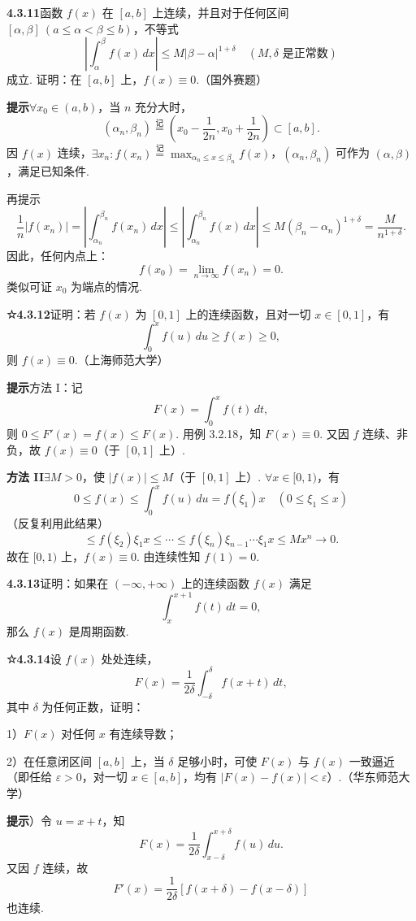 \documentclass[UTF8, 12pt, fontset=fandol, oneside]{ctexart}
\begin{document}
\noindent\textbf{4.3.11}\quad 函数 $f(x)$ 在 $[a,b]$ 上连续，并且对于任何区间 $[\alpha,\beta]\ (a\le\alpha<\beta\le b)$，不等式
\[
\left|\int_\alpha^\beta f(x)\,dx\right|
\le M|\beta-\alpha|^{1+\delta}\quad(M,\delta\text{ 是正常数})
\]
成立. 证明：在 $[a,b]$ 上，$f(x)\equiv0$.（国外赛题）

\noindent\textbf{提示}\quad $\forall x_0\in(a,b)$，当 $n$ 充分大时，
\[
(\alpha_n,\beta_n)\stackrel{\text{记}}{=}\left(x_0-\frac1{2n},x_0+\frac1{2n}\right)\subset[a,b].
\]
因 $f(x)$ 连续，$\exists x_n:f(x_n)\stackrel{\text{记}}{=}\max_{\alpha_n\le x\le\beta_n}f(x)$，$(\alpha_n,\beta_n)$ 可作为 $(\alpha,\beta)$，满足已知条件.

再提示
\[
\frac1n|f(x_n)|
=\left|\int_{\alpha_n}^{\beta_n}f(x_n)\,dx\right|
\le\left|\int_{\alpha_n}^{\beta_n}f(x)\,dx\right|
\le M(\beta_n-\alpha_n)^{1+\delta}=\frac{M}{n^{1+\delta}}.
\]
因此，任何内点上：
\[
f(x_0)=\lim_{n\to\infty}f(x_n)=0.
\]
类似可证 $x_0$ 为端点的情况.

\noindent\textbf{☆4.3.12}\quad 证明：若 $f(x)$ 为 $[0,1]$ 上的连续函数，且对一切 $x\in[0,1]$，有
\[
\int_0^x f(u)\,du\ge f(x)\ge0,
\]
则 $f(x)\equiv0$.（上海师范大学）

\noindent\textbf{提示}\quad 方法 I：记
\[
F(x)=\int_0^x f(t)\,dt,
\]
则 $0\le F'(x)=f(x)\le F(x)$. 用例 3.2.18，知 $F(x)\equiv0$. 又因 $f$ 连续、非负，故 $f(x)\equiv0$（于 $[0,1]$ 上）.

\noindent\textbf{方法 II}\quad $\exists M>0$，使 $|f(x)|\le M$（于 $[0,1]$ 上）. $\forall x\in[0,1)$，有
\[
0\le f(x)\le\int_0^x f(u)\,du=f(\xi_1)x\quad(0\le\xi_1\le x)
\]
（反复利用此结果）
\[
\le f(\xi_2)\xi_1x\le\cdots\le f(\xi_n)\xi_{n-1}\cdots\xi_1x\le Mx^n\to0.
\]
故在 $[0,1)$ 上，$f(x)\equiv0$. 由连续性知 $f(1)=0$.

\noindent\textbf{4.3.13}\quad 证明：如果在 $(-\infty,+\infty)$ 上的连续函数 $f(x)$ 满足
\[
\int_x^{x+1}f(t)\,dt=0,
\]
那么 $f(x)$ 是周期函数.

\noindent\textbf{☆4.3.14}\quad 设 $f(x)$ 处处连续，
\[
F(x)=\frac1{2\delta}\int_{-\delta}^{\delta}f(x+t)\,dt,
\]
其中 $\delta$ 为任何正数，证明：

1）$F(x)$ 对任何 $x$ 有连续导数；

2）在任意闭区间 $[a,b]$ 上，当 $\delta$ 足够小时，可使 $F(x)$ 与 $f(x)$ 一致逼近（即任给 $\varepsilon>0$，对一切 $x\in[a,b]$，均有 $|F(x)-f(x)|<\varepsilon$）.（华东师范大学）

\noindent\textbf{提示}）令 $u=x+t$，知
\[
F(x)=\frac1{2\delta}\int_{x-\delta}^{x+\delta}f(u)\,du.
\]
又因 $f$ 连续，故
\[
F'(x)=\frac1{2\delta}[f(x+\delta)-f(x-\delta)]
\]
也连续.
\end{document}
